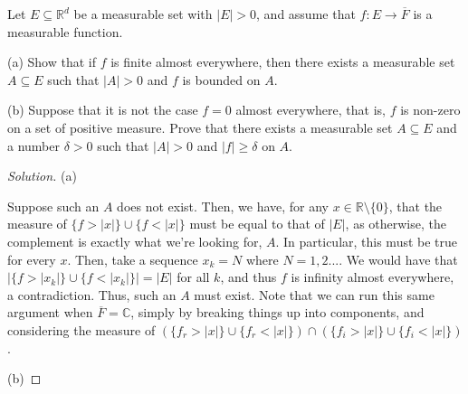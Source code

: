\documentclass[10pt]{article}
\newenvironment{problem}[2][Problem]{\begin{trivlist}
\item[\hskip \labelsep {\bfseries #1}\hskip \labelsep {\bfseries #2.}]}{\end{trivlist}}
\begin{document}
\begin{problem}{3.1.19}
Let $E \subseteq \mathbb{R}^d$ be a measurable set with $|E| > 0$, and assume that $f: E \to \overline{F}$ is a measurable function.

(a) Show that if $f$ is finite almost everywhere, then there exists a measurable set $A \subseteq E$ such that $|A| > 0$ and $f$ is bounded on $A$. 

(b) Suppose that it is not the case $f=0$ almost everywhere, that is, $f$ is non-zero on a set of positive measure. Prove that there exists a measurable set $A \subseteq E$ and a number $\delta > 0$ such that $|A| > 0$ and $|f| \geq \delta$ on $A$.

\end{problem}
\begin{proof}[Solution]

(a)

Suppose such an $A$ does not exist. Then, we have, for any $x \in \mathbb{R} \setminus \{ 0 \}$, that the measure of $\{ f > |x| \} \cup \{ f < |x| \}$ must be equal to that of $|E|$, as otherwise, the complement is exactly what we're looking for, $A$. In particular, this must be true for every $x$. Then, take a sequence $x_k  = N$ where $N  = 1,2...$. We would have that  $|\{ f > |x_k| \} \cup \{ f < |x_k| \}|  = |E|$ for all $k$, and thus $f$ is infinity almost everywhere, a contradiction. Thus, such an $A$ must exist. Note that we can run this same argument when $\overline{F} = \mathbb{C}$, simply by breaking things up into components, and considering the measure of $(\{ f_r > |x| \} \cup \{ f_r < |x| \}) \cap (\{ f_i > |x| \} \cup \{ f_i < |x| \})$.

(b)


\end{proof}
\end{document}
